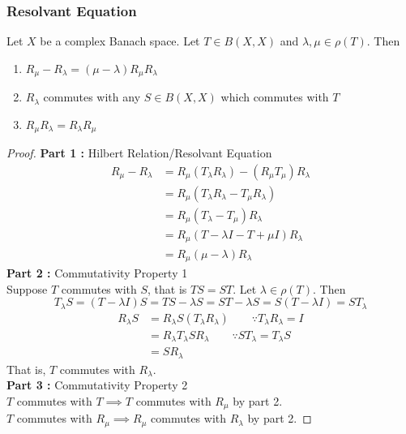 \subsubsection{Resolvant Equation}
\begin{theorem}
	Let $X$ be a complex Banach space.
	Let $T \in B(X,X)$ and $\lambda,\mu \in \rho(T)$.
	Then
	\begin{enumerate}
		\item $R_\mu - R_\lambda = (\mu - \lambda)R_\mu R_\lambda$ 
		\item $R_\lambda$ commutes with any $S \in B(X,X)$ which commutes with $T$
		\item $R_\mu R_\lambda = R_\lambda R_\mu$
	\end{enumerate}
\end{theorem}
\begin{proof}
	\textbf{ Part 1 : } Hilbert Relation/Resolvant Equation
	\begin{align*}
		R_\mu - R_\lambda 
		& = R_\mu (T_\lambda R_\lambda) - (R_\mu T_\mu)R_\lambda \\
		& = R_\mu (T_\lambda R_\lambda - T_\mu R_\lambda)\\
		& = R_\mu (T_\lambda - T_\mu) R_\lambda \\
		& = R_\mu (T-\lambda I - T+\mu I) R_\lambda \\
		& = R_\mu (\mu - \lambda) R_\lambda
	\end{align*}
	\textbf{ Part 2 : } Commutativity Property 1\\
		Suppose $T$ commutes with $S$, that is $TS = ST$.
		Let $\lambda \in \rho(T)$.
		Then 
		\[ T_\lambda S = (T - \lambda I)S = TS - \lambda S = ST - \lambda S = S(T-\lambda I) = ST_\lambda \]
	\begin{align*}
		R_\lambda S 
		& = R_\lambda S (T_\lambda R_\lambda)\qquad \because T_\lambda R_\lambda = I\\
		& = R_\lambda T_\lambda S R_\lambda \qquad \because ST_\lambda = T_\lambda S\\
		& = S R_\lambda
	\end{align*}
	That is, $T$ commutes with $R_\lambda$.\\
	\textbf{ Part 3 : } Commutativity Property 2\\
	$T$ commutes with $T \implies T$ commutes with $R_\mu$ by part 2.\\
	$T$ commutes with $R_\mu \implies R_\mu$ commutes with $R_\lambda$ by part 2.
	\end{proof}

